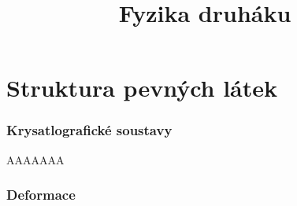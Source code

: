 \documentclass{article}
\title{\vspace{-2cm}Fyzika druháku\vspace{-1.7cm}}
\date{}
\author{}
\begin{document}
\maketitle

\part{Struktura pevných látek}

\section{Krysatlografické soustavy}
AAAAAAA

\section{Deformace}
\end{document}
